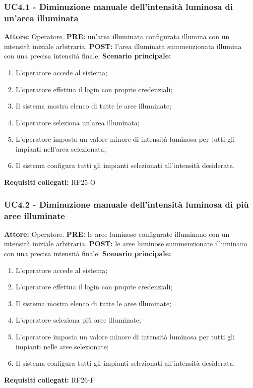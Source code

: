 \documentclass[a4paper, 12pt]{article}
\begin{document}
\subsubsection{UC4.1 - Diminuzione manuale dell'intensità luminosa di un'area illuminata}
\textbf{Attore:} Operatore.\newline
\textbf{PRE:} un'area illuminata configurata illumina con un intensità iniziale arbitraria.\newline
\textbf{POST:} l'area illuminata summenzionata illumina con una precisa intensità finale.\newline
\textbf{Scenario principale:}
\begin{enumerate}
    \item L'operatore accede al sistema;
    \item L'operatore effettua il login con proprie credenziali;
    \item Il sistema mostra elenco di tutte le aree illuminate;
    \item L'operatore seleziona un'area illuminata;
    \item L'operatore imposta un valore minore di intensità luminosa per tutti gli impianti nell'area selezionata;
    \item Il sistema configura tutti gli impianti selezionati all'intensità desiderata.
\end{enumerate}
\textbf{Requisiti collegati:} RF25-O\newline

\subsubsection{UC4.2 - Diminuzione manuale dell'intensità luminosa di più aree illuminate}
\textbf{Attore:} Operatore.\newline
\textbf{PRE:} le aree luminose configurate illuminano con un intensità iniziale arbitraria.\newline
\textbf{POST:} le aree luminose summenzionate illuminano con una precisa intensità finale.\newline
\textbf{Scenario principale:}
\begin{enumerate}
    \item L'operatore accede al sistema;
    \item L'operatore effettua il login con proprie credenziali;
    \item Il sistema mostra elenco di tutte le aree illuminate;
    \item L'operatore seleziona più aree illuminate;
    \item L'operatore imposta un valore minore di intensità luminosa per tutti gli impianti nelle aree selezionate;
    \item Il sistema configura tutti gli impianti selezionati all'intensità desiderata.
\end{enumerate}
\textbf{Requisiti collegati:} RF26-F\newline
\end{document}
